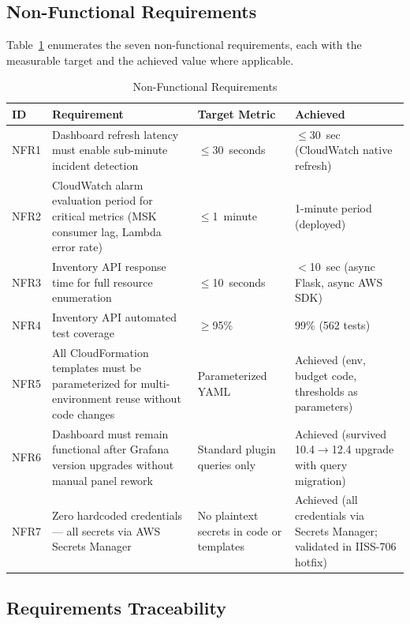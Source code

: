 \subsection{Non-Functional Requirements}

Table~\ref{tab:nonfunctional_requirements} enumerates the seven
non-functional requirements, each with the measurable target and the
achieved value where applicable.

\begin{table}[ht]
\centering
\caption{Non-Functional Requirements}
\label{tab:nonfunctional_requirements}
\begin{tabular}{p{0.8cm}p{4.5cm}p{2.8cm}p{3.5cm}}
\toprule
\textbf{ID} & \textbf{Requirement} & \textbf{Target Metric} & \textbf{Achieved} \\
\midrule
NFR1 & Dashboard refresh latency must enable sub-minute incident detection & $\leq$30~seconds & \textcolor{smumaroon}{$\leq$30~sec} (CloudWatch native refresh) \\
\midrule
NFR2 & CloudWatch alarm evaluation period for critical metrics (MSK consumer lag, Lambda error rate) & $\leq$1~minute & \textcolor{smumaroon}{1-minute period} (deployed) \\
\midrule
NFR3 & Inventory API response time for full resource enumeration & $\leq$10~seconds & \textcolor{smumaroon}{$<$10~sec} (async Flask, async AWS SDK) \\
\midrule
NFR4 & Inventory API automated test coverage & $\geq$95\% & \textcolor{smumaroon}{99\%} (562 tests) \\
\midrule
NFR5 & All CloudFormation templates must be parameterized for multi-environment reuse without code changes & Parameterized YAML & \textcolor{smumaroon}{Achieved} (env, budget code, thresholds as parameters) \\
\midrule
NFR6 & Dashboard must remain functional after Grafana version upgrades without manual panel rework & Standard plugin queries only & \textcolor{smumaroon}{Achieved} (survived 10.4$\to$12.4 upgrade with query migration) \\
\midrule
NFR7 & Zero hardcoded credentials --- all secrets via AWS Secrets Manager & No plaintext secrets in code or templates & \textcolor{smumaroon}{Achieved} (all credentials via Secrets Manager; validated in IISS-706 hotfix) \\
\bottomrule
\end{tabular}
\end{table}

\subsection{Requirements Traceability}

